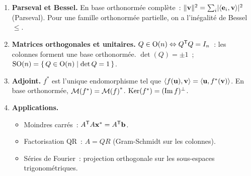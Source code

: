 \begin{framed}
\begin{enumerate}[label=\textbf{\arabic*.},leftmargin=2em]
  \item \textbf{Parseval et Bessel.} En base orthonormée complète~:
    $\lVert\mathbf{v}\rVert^2=\sum_i\lvert\langle\mathbf{e}_{i},\mathbf{v}\rangle\rvert^2$
    (Parseval). Pour une famille orthonormée partielle, on a
    l'inégalité de Bessel $\leq$.

  \item \textbf{Matrices orthogonales et unitaires.}
    $Q\in\operatorname{O}(n)\Leftrightarrow{Q}^{\mathsf{T}}Q=I_n$~: les colonnes
    forment une base orthonormée. $\det(Q)=\pm 1$~;
    $\operatorname{SO}(n)=\left\{\,Q\in\operatorname{O}(n)\;\middle|\;\det Q=1\,\right\}$.

  \item \textbf{Adjoint.} $f^*$ est l'unique endomorphisme tel que
    $\langle f(\mathbf{u}),\mathbf{v}\rangle=\langle\mathbf{u},f^*(\mathbf{v})\rangle$. En
    base orthonormée, $\mathcal{M}(f^*)={\mathcal{M}(f)}^{*}$.
    $\operatorname{Ker}(f^*)=(\operatorname{Im} f)^\perp$.

  \item \textbf{Applications.}
    \begin{itemize}
      \item Moindres carrés~: ${A}^{\mathsf{T}}A\mathbf{x}^*
        ={A}^{\mathsf{T}}\mathbf{b}$.
      \item Factorisation QR~: $A=QR$ (Gram-Schmidt sur les colonnes).
      \item Séries de Fourier~: projection orthogonale sur les
        sous-espaces trigonométriques.
    \end{itemize}
\end{enumerate}
\end{framed}
